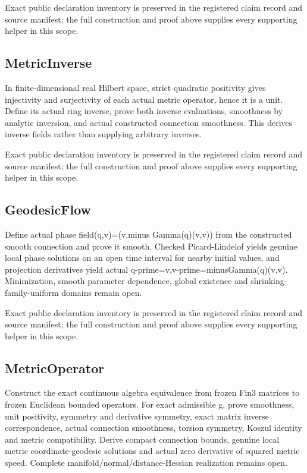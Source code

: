 \documentclass[11pt]{article}
\theoremstyle{definition}
\theoremstyle{remark}
\numberwithin{equation}{section}
\begin{document}
Exact public declaration inventory is preserved in the registered claim record and source manifest; the full construction and proof above supplies every supporting helper in this scope.

\subsection{MetricInverse}
\label{daytime-v010:metricinverse}
In finite-dimensional real Hilbert space, strict quadratic positivity gives injectivity and surjectivity of each actual metric operator, hence it is a unit. Define its actual ring inverse, prove both inverse evaluations, smoothness by analytic inversion, and actual constructed connection smoothness. This derives inverse fields rather than supplying arbitrary inverses.

Exact public declaration inventory is preserved in the registered claim record and source manifest; the full construction and proof above supplies every supporting helper in this scope.

\subsection{GeodesicFlow}
\label{daytime-v010:geodesicflow}
Define actual phase field(q,v)=(v,minus Gamma(q)(v,v)) from the constructed smooth connection and prove it smooth. Checked Picard-Lindelof yields genuine local phase solutions on an open time interval for nearby initial values, and projection derivatives yield actual q-prime=v,v-prime=minusGamma(q)(v,v). Minimization, smooth parameter dependence, global existence and shrinking-family-uniform domains remain open.

Exact public declaration inventory is preserved in the registered claim record and source manifest; the full construction and proof above supplies every supporting helper in this scope.

\subsection{MetricOperator}
\label{daytime-v010:metricoperator}
Construct the exact continuous algebra equivalence from frozen Fin3 matrices to frozen Euclidean bounded operators. For exact admissible g, prove smoothness, unit positivity, symmetry and derivative symmetry, exact matrix inverse correspondence, actual connection smoothness, torsion symmetry, Koszul identity and metric compatibility. Derive compact connection bounds, genuine local metric coordinate-geodesic solutions and actual zero derivative of squared metric speed. Complete manifold/normal/distance-Hessian realization remains open.
\end{document}
